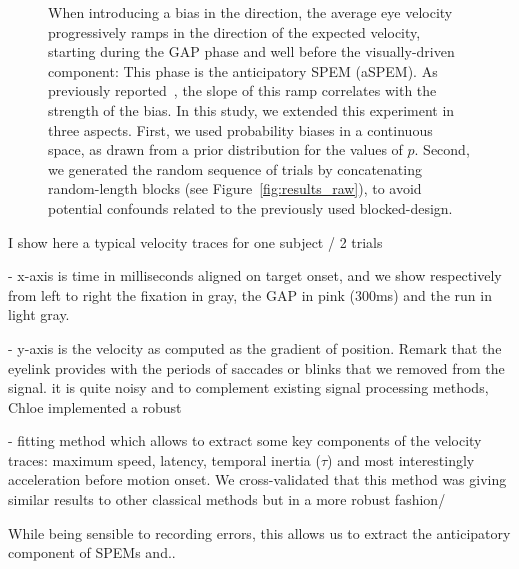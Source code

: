 \documentclass[12pt,english]{article}%
\newcommand{\citep}[1]{\parencite{#1}}
\newcommand{\seeFig}[1]{Figure~\ref{fig:#1}}
\begin{document}
\begin{figure}
{When introducing a bias in the direction,
the average eye velocity progressively ramps
in the direction of the expected velocity, starting during the GAP phase and well before the visually-driven component:
This phase is the anticipatory SPEM (aSPEM).
As previously reported~\citep{Montagnini2010, SantosKowler2017,Damasse18},
the slope of this ramp correlates with the strength of the bias.
In this study, we extended this experiment in three aspects.
First, we used probability biases in a continuous space,
as drawn from a prior distribution for the values of $p$.
Second, we generated the random sequence of trials
by concatenating random-length blocks (see \seeFig{results_raw}),
to avoid potential confounds related to the previously used blocked-design.
}
\label{fig:introB}
\end{figure}


I show here a typical velocity traces for one subject / 2 trials

- x-axis is time in milliseconds aligned on target onset,
and we show respectively from left to right the fixation in gray,
the GAP in pink (300ms) and the run in light gray.

- y-axis is the velocity as computed as the gradient of position.
Remark that the eyelink provides with the periods of saccades or
 blinks that we removed from the signal. it is quite noisy and
 to complement existing signal processing methods,
 Chloe implemented a robust

- fitting method which allows to extract some key components of
the velocity traces: maximum speed, latency, temporal inertia ($\tau$)
 and most interestingly acceleration before motion onset.
 We cross-validated that this method was giving similar results
  to other classical methods but in a more robust fashion/

While being sensible to recording errors, this allows us to extract the
 anticipatory component of SPEMs and..

\end{document}
